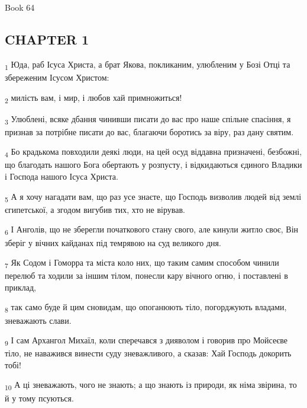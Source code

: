 Book 64
\subsection{CHAPTER 1}
\begin{tcolorbox}
\textsubscript{1} Юда, раб Ісуса Христа, а брат Якова, покликаним, улюбленим у Бозі Отці та збереженим Ісусом Христом:
\end{tcolorbox}
\begin{tcolorbox}
\textsubscript{2} милість вам, і мир, і любов хай примножиться!
\end{tcolorbox}
\begin{tcolorbox}
\textsubscript{3} Улюблені, всяке дбання чинивши писати до вас про наше спільне спасіння, я признав за потрібне писати до вас, благаючи боротись за віру, раз дану святим.
\end{tcolorbox}
\begin{tcolorbox}
\textsubscript{4} Бо крадькома повходили деякі люди, на цей осуд віддавна призначені, безбожні, що благодать нашого Бога обертають у розпусту, і відкидаються єдиного Владики і Господа нашого Ісуса Христа.
\end{tcolorbox}
\begin{tcolorbox}
\textsubscript{5} А я хочу нагадати вам, що раз усе знаєте, що Господь визволив людей від землі єгипетської, а згодом вигубив тих, хто не вірував.
\end{tcolorbox}
\begin{tcolorbox}
\textsubscript{6} І Анголів, що не зберегли початкового стану свого, але кинули житло своє, Він зберіг у вічних кайданах під темрявою на суд великого дня.
\end{tcolorbox}
\begin{tcolorbox}
\textsubscript{7} Як Содом і Гоморра та міста коло них, що таким самим способом чинили перелюб та ходили за іншим тілом, понесли кару вічного огню, і поставлені в приклад,
\end{tcolorbox}
\begin{tcolorbox}
\textsubscript{8} так само буде й цим сновидам, що опоганюють тіло, погорджують владами, зневажають слави.
\end{tcolorbox}
\begin{tcolorbox}
\textsubscript{9} І сам Архангол Михаїл, коли сперечався з дияволом і говорив про Мойсеєве тіло, не наважився винести суду зневажливого, а сказав: Хай Господь докорить тобі!
\end{tcolorbox}
\begin{tcolorbox}
\textsubscript{10} А ці зневажають, чого не знають; а що знають із природи, як німа звірина, то й у тому псуються.
\end{tcolorbox}
